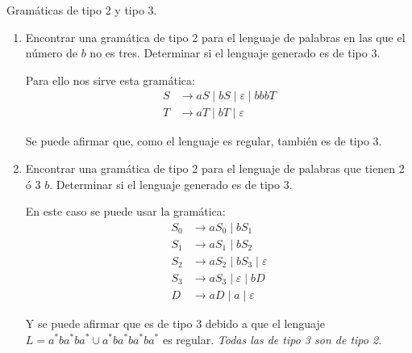 \documentclass[12pt]{report} %
\begin{document}
\begin{ejercicio}
Gramáticas de tipo 2 y tipo 3. 

\begin{enumerate}[label=\alph*)]
    \item Encontrar una gramática de tipo 2 para el lenguaje de palabras en las que el número de $b$ no es tres.  
        Determinar si el lenguaje generado es de tipo 3.

        \begin{solucion}[a]

        Para ello nos sirve esta gramática:
        \begin{align*}
        S &\to aS \mid bS \mid \varepsilon \mid bbbT \\
        T &\to aT \mid bT \mid \varepsilon
        \end{align*}

        Se puede afirmar que, como el lenguaje es regular, también es de tipo 3.

        \end{solucion}

    \item Encontrar una gramática de tipo 2 para el lenguaje de palabras que tienen 2 ó 3 $b$.  
        Determinar si el lenguaje generado es de tipo 3.

        \begin{solucion}[b]

        En este caso se puede usar la gramática:
        \begin{align*}
        S_0 &\to aS_0 \mid bS_1 \\
        S_1 &\to aS_1 \mid bS_2 \\
        S_2 &\to aS_2 \mid bS_3 \mid \varepsilon \\
        S_3 &\to aS_3 \mid \varepsilon \mid bD \\
        D &\to aD \mid a \mid \varepsilon
        \end{align*}

        Y se puede afirmar que es de tipo 3 debido a que el lenguaje $L = a^{*}b a^{*}b a^{*} \cup a^{*}b a^{*}b a^{*}b a^{*}$ es regular. \textit{Todas las de tipo 3 son de tipo 2.}

        \end{solucion}


\end{enumerate}

\end{ejercicio}
\end{document}
